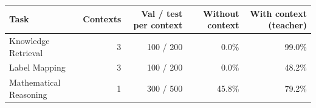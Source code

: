 \begin{tabular}{lrrrr}
\toprule
Task & Contexts & Val / test per context & Without context & With context (teacher) \\
\midrule
Knowledge Retrieval & 3 & 100 / 200 & 0.0\% & 99.0\% \\
Label Mapping & 3 & 100 / 200 & 0.0\% & 48.2\% \\
Mathematical Reasoning & 1 & 300 / 500 & 45.8\% & 79.2\% \\
\bottomrule
\end{tabular}
